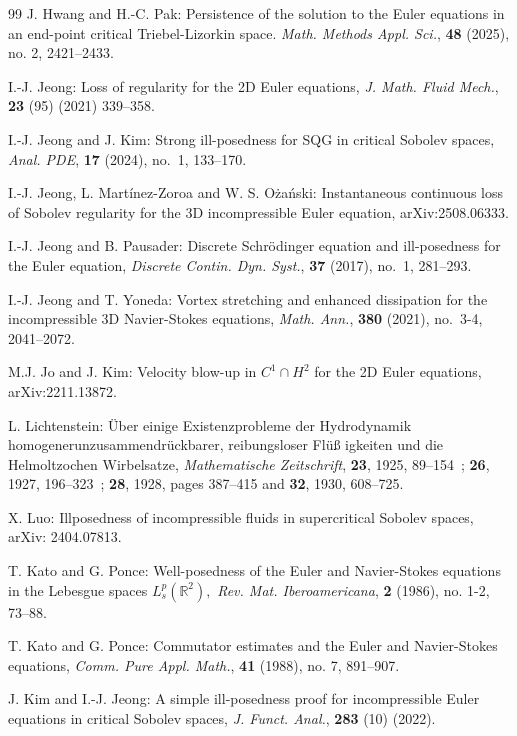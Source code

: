 \documentclass[11pt]{amsart}
\newcommand{\R}{{\mathbb R}}
\numberwithin{equation}{section}
\begin{document}
\begin{thebibliography}{99}
   J. Hwang and H.-C. Pak:  Persistence of the solution to the Euler equations in an end-point critical Triebel-Lizorkin space. \emph{Math. Methods Appl. Sci.}, {\bf 48} (2025), no. 2, 2421--2433.   
 
  I.-J. Jeong:  Loss of regularity for the 2D Euler equations, \emph{J. Math. Fluid Mech.}, {\bf 23} (95) (2021) 339–358.

 I.-J. Jeong and J. Kim:  Strong ill-posedness for SQG in critical Sobolev spaces, \emph{Anal. PDE},  {\bf 17} (2024), no.~1, 133--170. 

  I.-J. Jeong, L. Mart\'{i}nez-Zoroa and W. S. O\.{z}a\'{n}ski: {Instantaneous continuous loss of Sobolev regularity for the 3D incompressible Euler equation}, arXiv:2508.06333.
 
 I.-J. Jeong and B. Pausader: Discrete Schr\"odinger equation and ill-posedness for the Euler equation, 
\emph{Discrete Contin. Dyn. Syst.},  {\bf 37} (2017), no.~1, 281--293. 

 I.-J. Jeong and T. Yoneda:  Vortex stretching and enhanced dissipation for the incompressible 3D Navier-Stokes equations, \emph{Math. Ann.},  {\bf 380} (2021), no.~3-4, 2041--2072.

 M.J. Jo and J. Kim: Velocity blow-up in $C^1\cap H^2$  for the 2D Euler equations,  arXiv:2211.13872. 
   
 L. Lichtenstein: \"Uber einige Existenzprobleme der Hydro\-dyna\-mik
homo\-ge\-ne\-run\-zu\-sam\-men\-dr\"uck\-barer, reibungsloser Fl\"u\ss
ig\-kei\-ten und die Helmoltzochen Wirbelsatze, {\em Mathematische
Zeit\-schrift}, {\bf 23}, 1925, 89--154~; {\bf 26}, 1927, 196--323~;
{\bf 28}, 1928, pages 387--415 and {\bf 32}, 1930, 608--725.

   X. Luo:  {Illposedness of incompressible fluids in supercritical Sobolev spaces},  arXiv: 2404.07813. 

 T. Kato and G. Ponce:  Well-posedness of the Euler and Navier-Stokes equations in the Lebesgue spaces
 $L^p_s(\R^2),$ \emph{Rev. Mat. Iberoamericana}, {\bf 2} (1986), no. 1-2, 73–88.
 
 T. Kato and G. Ponce:  Commutator estimates and the Euler and Navier-Stokes equations,
\emph{Comm. Pure Appl. Math.}, {\bf 41} (1988), no. 7, 891--907.  


  J. Kim and  I.-J. Jeong:  A simple ill-posedness proof for incompressible Euler equations in critical Sobolev spaces, \emph{J. Funct. Anal.}, {\bf  283} (10) (2022). 


\end{thebibliography}
\end{document}
